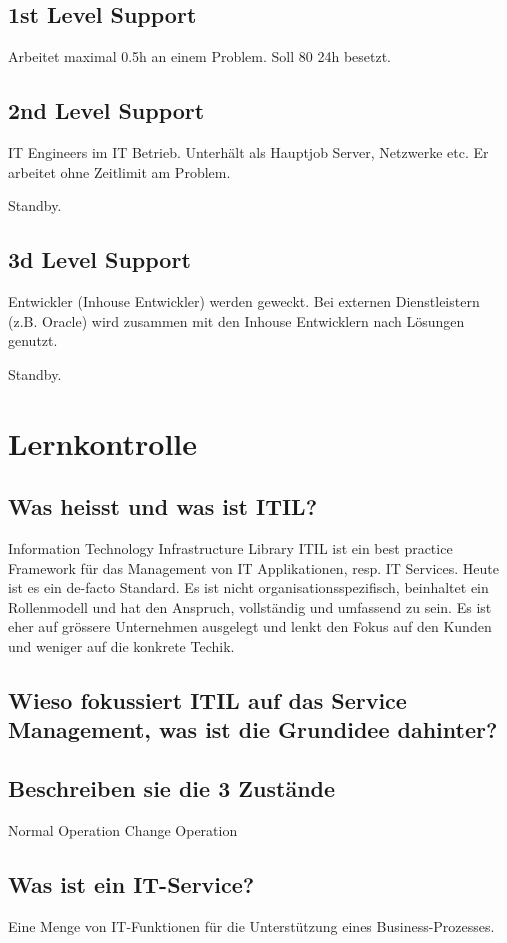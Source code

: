 \subsection{1st Level Support}
Arbeitet maximal 0.5h an einem Problem. Soll 80%
24h besetzt.

\subsection{2nd Level Support}
IT Engineers im IT Betrieb. Unterhält als Hauptjob Server, Netzwerke etc.
Er arbeitet ohne Zeitlimit am Problem.

Standby.

\subsection{3d Level Support}
Entwickler (Inhouse Entwickler) werden geweckt. Bei externen Dienstleistern (z.B. Oracle) wird zusammen mit den Inhouse Entwicklern nach Lösungen genutzt.

Standby.

\section{Lernkontrolle}
\subsection{Was heisst und was ist ITIL?}

Information Technology Infrastructure Library
ITIL ist ein best practice Framework für das Management von IT Applikationen, resp. IT Services. Heute ist es ein de-facto Standard. Es ist nicht organisationsspezifisch, beinhaltet ein Rollenmodell und hat den Anspruch, vollständig und umfassend zu sein. Es ist eher auf grössere Unternehmen ausgelegt und lenkt den Fokus auf den Kunden und weniger auf die konkrete Techik.

\subsection{Wieso fokussiert ITIL auf das Service Management, was ist die Grundidee dahinter?}

\subsection{Beschreiben sie die 3 Zustände}
Normal Operation
Change Operation

\subsection{Was ist ein IT-Service?}

Eine Menge von IT-Funktionen für die Unterstützung eines Business-Prozesses. 